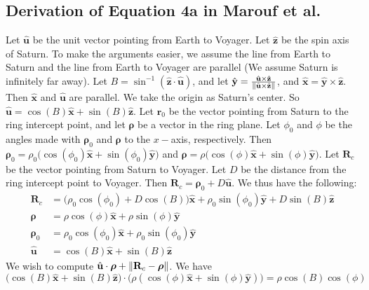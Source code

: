 \documentclass{article}
\theoremstyle{mystyle}
\DeclarePairedDelimiter\norm{\lVert}{\rVert}
\begin{document}
\subsection{Derivation of Equation 4a in Marouf et al.}
Let $\hat{\mathbf{u}}$ be the unit vector pointing from Earth to Voyager. Let $\hat{\mathbf{z}}$ be the spin axis of Saturn. To make the arguments easier, we assume the line from Earth to Saturn and the line from Earth to Voyager are parallel (We assume Saturn is infinitely far away). Let $B = \sin^{-1}(\hat{\mathbf{z}}\cdot \hat{\mathbf{u}})$, and let $\hat{\mathbf{y}} = \frac{\hat{\mathbf{u}}\times \hat{\mathbf{z}}}{\norm{\hat{\mathbf{u}}\times \hat{\mathbf{z}}}}$, and $\hat{\mathbf{x}} = \hat{\mathbf{y}}\times \hat{\mathbf{z}}$. Then $\hat{\mathbf{x}}$ and $\hat{\mathbf{u}}$ are parallel. We take the origin as Saturn's center. So $\hat{\mathbf{u}} = \cos(B)\hat{\mathbf{x}}+\sin(B)\hat{\mathbf{z}}$. Let $\mathbf{r}_{0}$ be the vector pointing from Saturn to the ring intercept point, and let $\boldsymbol{\rho}$ be a vector in the ring plane. Let $\phi_0$ and $\phi$ be the angles made with $\boldsymbol{\rho}_0$ and $\boldsymbol{\rho}$ to the $x-$axis, respectively. Then $\boldsymbol{\rho}_{0} = \rho_{0}\big(\cos(\phi_0)\hat{\mathbf{x}}+\sin(\phi_{0})\hat{\mathbf{y}}\big)$ and $\boldsymbol{\rho} = \rho\big(\cos(\phi)\hat{\mathbf{x}}+\sin(\phi)\hat{\mathbf{y}}\big)$. Let $\mathbf{R}_{c}$ be the vector pointing from Saturn to Voyager. Let $D$ be the distance from the ring intercept point to Voyager. Then $\mathbf{R}_{c} = \boldsymbol{\rho}_{0}+D\hat{\mathbf{u}}$. We thus have the following:
\begin{align*}
\mathbf{R}_{c} &= \big(\rho_{0}\cos(\phi_0)+D\cos(B)\big)\hat{\mathbf{x}}+\rho_{0}\sin(\phi_{0})\hat{\mathbf{y}}+D\sin(B)\hat{\mathbf{z}}\\
\boldsymbol{\rho} &= \rho\cos(\phi)\hat{\mathbf{x}}+\rho\sin(\phi)\hat{\mathbf{y}}\\
\boldsymbol{\rho}_{0} &= \rho_{0}\cos(\phi_0)\hat{\mathbf{x}}+\rho_{0}\sin(\phi_{0})\hat{\mathbf{y}}\\
\hat{\mathbf{u}} &= \cos(B)\hat{\mathbf{x}}+\sin(B)\hat{\mathbf{z}}
\end{align*}
We wish to compute $\hat{\mathbf{u}}\cdot \boldsymbol{\rho}+\norm{\mathbf{R}_{c}-\boldsymbol{\rho}}$. We have
\begin{equation*}
\big(\cos(B)\hat{\mathbf{x}}+\sin(B)\hat{\mathbf{z}}\big)\cdot\big(\rho(\cos(\phi)\hat{\mathbf{x}}+\sin(\phi)\hat{\mathbf{y}})\big) = \rho\cos(B)\cos(\phi)
\end{equation*}
\end{document}
